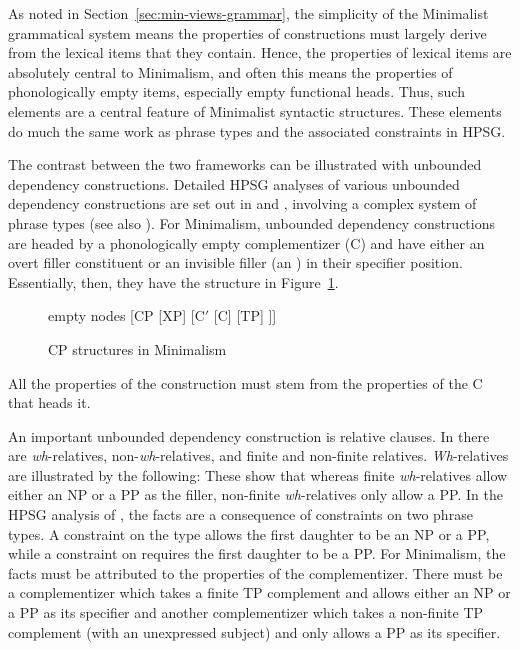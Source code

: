 \documentclass[output=paper
 	        ,biblatex
                ,babelshorthands
                ,newtxmath
                ,draftmode
                ,colorlinks, citecolor=brown
]{langscibook}
\begin{document}
As noted in Section~\ref{sec:min-views-grammar}, the simplicity of the Minimalist grammatical system
means the properties of constructions must largely derive from the lexical items that they
contain. Hence, the properties of lexical items are absolutely central to Minimalism, and often this
means the properties of phonologically empty items, especially empty functional
heads. Thus, such elements are a central feature of Minimalist syntactic
structures. These elements do much the same work as phrase types and the associated constraints in HPSG. 

The contrast between the two frameworks can be illustrated with unbounded dependency
constructions. Detailed HPSG analyses of various unbounded dependency constructions are set out in
\citet{Sag97a,Sag2010b} and \citet{GSag2000a-u}, involving a complex system of phrase types (see
also ). For
Minimalism, unbounded dependency constructions are headed by a phonologically empty complementizer
(C) and have either an overt filler constituent or an invisible filler (an ) in their
specifier position. Essentially, then, they have the structure in Figure~\ref{fig:min-CP}.
\begin{figure}
	\centering
	\begin{forest} %
		empty nodes
		[CP
		[XP]
		[C$'$ [C] [TP]
		]]
	\end{forest}
	\caption{\label{fig:min-CP}CP structures in Minimalism}
\end{figure}
All the properties of the construction must stem from the properties of the C that heads it. 

An important unbounded dependency construction is relative clauses. In  there are \emph{wh}-relatives, non-\emph{wh}-relatives, and finite and non-finite relatives. \emph{Wh}-relatives are illustrated by the following:
\eal
{}\label{ex:min-someone-who-can}
\label{ex:min-someone-on-whom-can}
\zl 
\eal
{}\label{ex:min-someone-who-to}
\label{ex:min-someone-whom-to}
\zl 
These show that whereas finite \emph{wh}-relatives allow either an NP or a PP as the filler,
non-finite \emph{wh}-relatives only allow a PP. In the HPSG analysis of \citet{Sag97a}, the facts
are a consequence of constraints on two phrase types. A constraint on the type
 allows the first daughter to be an
NP or a PP, while a constraint on 
requires the first daughter to be a PP. For Minimalism, the facts must be attributed to the
properties of the complementizer. There must be a complementizer which takes a finite TP complement
and allows either an NP or a PP as its specifier and another complementizer which takes a non-finite
TP complement (with an unexpressed subject) and only allows a PP as its specifier. 
\end{document}

